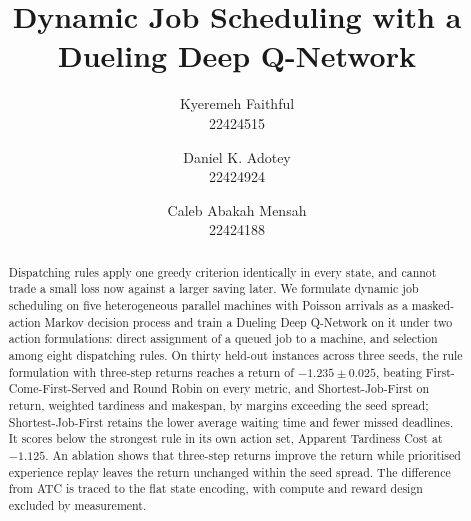 \documentclass[10pt,twocolumn,letterpaper]{article}
\begin{document}
\title{Dynamic Job Scheduling with a Dueling Deep Q-Network}

\author{Kyeremeh Faithful\\22424515\and Daniel K. Adotey\\22424924\and Caleb Abakah Mensah\\22424188}

\maketitle

\begin{abstract}
Dispatching rules apply one greedy criterion identically in every state, and cannot trade a
small loss now against a larger saving later. We formulate dynamic
job scheduling on five heterogeneous parallel machines with Poisson arrivals as a masked-action
Markov decision process and train a Dueling Deep Q-Network on it under two action formulations:
direct assignment of a queued job to a machine, and selection among eight dispatching rules. On
thirty held-out instances across three seeds, the rule formulation with three-step returns reaches
a return of $-1.235 \pm 0.025$, beating First-Come-First-Served and Round Robin on every metric, and Shortest-Job-First on
return, weighted tardiness and makespan, by margins exceeding the seed spread; Shortest-Job-First
retains the lower average waiting time and fewer missed deadlines. It scores below the strongest rule in its own action set, Apparent Tardiness Cost at $-1.125$. An ablation shows that three-step returns improve the
return while prioritised experience replay leaves the return unchanged within the seed spread. The
difference from ATC is traced to the flat state encoding, with compute and reward design excluded
by measurement.
\end{abstract}



{\small


}


\end{document}

